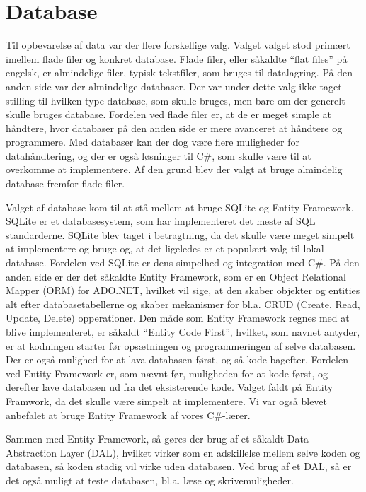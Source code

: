 \chapter{Database}
Til opbevarelse af data var der flere forskellige valg. Valget valget stod primært imellem flade filer og konkret database. 
Flade filer, eller såkaldte ``flat files'' på engelsk, er almindelige filer, typisk tekstfiler, som bruges til datalagring. 
På den anden side var der almindelige databaser. Der var under dette valg ikke taget stilling til hvilken type database, som skulle bruges, men bare om der generelt skulle bruges database. 
Fordelen ved flade filer er, at de er meget simple at håndtere, hvor databaser på den anden side er mere avanceret at håndtere og programmere. 
Med databaser kan der dog være flere muligheder for datahåndtering, og der er også løsninger til C\#, som skulle være til at overkomme at implementere.\citep{flatfiles} Af den grund blev der valgt at bruge almindelig database fremfor flade filer. 

Valget af database kom til at stå mellem at bruge SQLite og Entity Framework. SQLite er et databasesystem, som har implementeret det meste af SQL standarderne.
SQLite blev taget i betragtning, da det skulle være meget simpelt at implementere og bruge og, at det ligeledes er et populært valg til lokal database. 
Fordelen ved SQLite er dens simpelhed og integration med C\#. 
På den anden side er der det såkaldte Entity Framework, som er en Object Relational Mapper (ORM) for ADO.NET, hvilket vil sige, at den skaber objekter og entities alt efter databasetabellerne og skaber mekanismer for bl.a. CRUD (Create, Read, Update, Delete) opperationer. \citep{entity} 
Den måde som Entity Framework regnes med at blive implementeret, er såkaldt ``Entity Code First'', hvilket, som navnet antyder, er at kodningen starter før opsætningen og programmeringen af selve databasen. Der er også mulighed for at lava databasen først, og så kode bagefter.
Fordelen ved Entity Framework er, som nævnt før, muligheden for at kode først, og derefter lave databasen ud fra det eksisterende kode. 
Valget faldt på Entity Framwork, da det skulle være simpelt at implementere. Vi var også blevet anbefalet at bruge Entity Framework af vores C\#-lærer.

Sammen med Entity Framework, så gøres der brug af et såkaldt Data Abstraction Layer (DAL), hvilket virker som en adskillelse mellem selve koden og databasen, så koden stadig vil virke uden databasen. 
Ved brug af et DAL, så er det også muligt at teste databasen, bl.a. læse og skrivemuligheder. 
